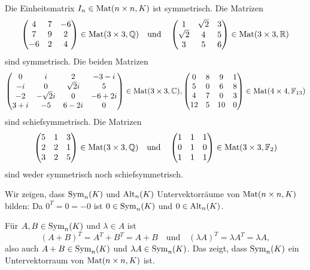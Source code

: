 \begin{bsp}
 Die Einheitsmatrix $I_n \in \mathrm{Mat}(n \times n, K)$ ist symmetrisch. Die Matrizen
 \[
  \begin{pmatrix}
    4 & 7 & -6 \\
    7 & 9 &  2 \\
   -6 & 2 &  4
  \end{pmatrix}
  \in \mathrm{Mat}(3 \times 3, \mathbb{Q})
  \quad\text{und}\quad
  \begin{pmatrix}
   1        & \sqrt{2} & 3 \\
   \sqrt{2} & 4        & 5 \\
   3        & 5        & 6
  \end{pmatrix}
  \in \mathrm{Mat}(3 \times 3, \mathbb{R})
 \]
 sind symmetrisch. Die beiden Matrizen
 \[
  \begin{pmatrix}
      0 & i          & 2         & -3-i   \\
     -i & 0          & \sqrt{2}i &  5    \\
     -2 & -\sqrt{2}i & 0         & -6+2i \\
    3+i & -5         & 6-2i      & 0
  \end{pmatrix}
  \in \mathrm{Mat}(3 \times 3, \mathbb{C}),
  \begin{pmatrix}
    0 & 8 &  9 & 1 \\
    5 & 0 &  6 & 8 \\
    4 & 7 &  0 & 3 \\
   12 & 5 & 10 & 0
  \end{pmatrix}
  \in \mathrm{Mat}(4 \times 4, \mathbb{F}_{13})
 \]
 sind schiefsymmetrisch. Die Matrizen
 \[
  \begin{pmatrix}
   5 & 1 & 3 \\
   2 & 2 & 1 \\
   3 & 2 & 5
  \end{pmatrix}
  \in \mathrm{Mat}(3 \times 3, \mathbb{Q})
  \quad\text{und}\quad
  \begin{pmatrix}
   1 & 1 & 1 \\
   0 & 1 & 0 \\
   1 & 1 & 1
  \end{pmatrix}
  \in \mathrm{Mat}(3 \times 3, \mathbb{F}_2)
 \]
 sind weder symmetrisch noch schiefsymmetrisch.
\end{bsp}


Wir zeigen, dass $\mathrm{Sym}_n(K)$ und $\mathrm{Alt}_n(K)$ Untervektorräume von $\mathrm{Mat}(n \times n, K)$ bilden: Da $0^T = 0 = -0$ ist $0 \in \mathrm{Sym}_n(K)$ und $0 \in \mathrm{Alt}_n(K)$.

Für $A, B \in \mathrm{Sym}_n(K)$ und $\lambda \in A$ ist
\[
 (A+B)^T = A^T + B^T = A+B
 \quad\text{und}\quad
 (\lambda A)^T = \lambda A^T = \lambda A,
\]
also auch $A+B \in \mathrm{Sym}_n(K)$ und $\lambda A \in \mathrm{Sym}_n(K)$. Das zeigt, dass $\mathrm{Sym}_n(K)$ ein Untervektorraum von $\mathrm{Mat}(n \times n, K)$ ist.

